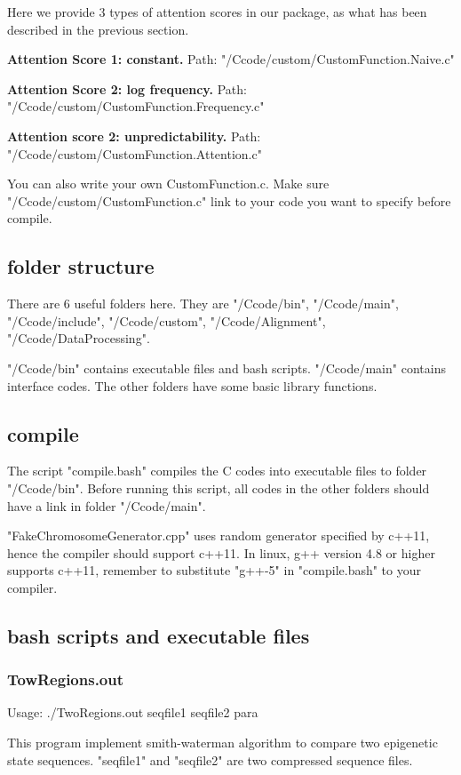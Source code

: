 \documentclass[a4paper]{article}
\begin{document}
\begin{CJK*}{UTF8}{kai}
Here we provide 3 types of attention scores in our package, as what has been described in the previous section.

\noindent
\textbf{Attention Score 1: constant.} Path: "/Ccode/custom/CustomFunction.Naive.c"

\noindent
\textbf{Attention Score 2: log frequency.} Path: "/Ccode/custom/CustomFunction.Frequency.c"

\noindent
\textbf{Attention score 2: unpredictability.} Path: "/Ccode/custom/CustomFunction.Attention.c"

You can also write your own CustomFunction.c. Make sure "/Ccode/custom/CustomFunction.c" link to your code you want to specify before compile.

\subsection{folder structure}
There are 6 useful folders here. They are "/Ccode/bin", "/Ccode/main", "/Ccode/include", "/Ccode/custom", "/Ccode/Alignment", "/Ccode/DataProcessing".

"/Ccode/bin" contains executable files and bash scripts. "/Ccode/main" contains interface codes. The other folders have some basic library functions.

\subsection{compile}

The script "compile.bash" compiles the C codes into executable files to folder "/Ccode/bin". Before running this script, all codes in the other folders should have a link in folder "/Ccode/main".

"FakeChromosomeGenerator.cpp" uses random generator specified by c++11, hence the compiler should support c++11. In linux, g++ version 4.8 or higher supports c++11, remember to substitute "g++-5" in "compile.bash" to your compiler.

\subsection{bash scripts and executable files}
\subsubsection{TowRegions.out}

Usage: ./TwoRegions.out seqfile1 seqfile2 para

This program implement smith-waterman algorithm to compare two epigenetic state sequences. "seqfile1" and "seqfile2" are two compressed sequence files.


\end{CJK*}
\end{document}
